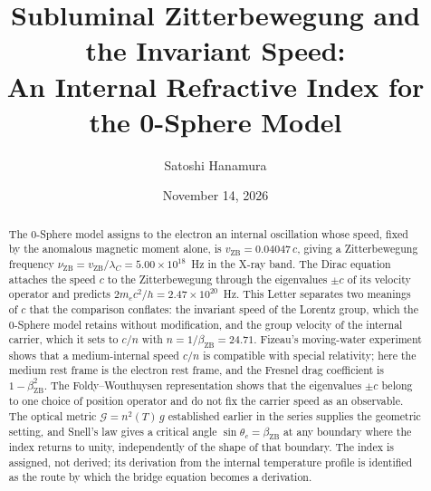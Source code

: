 \documentclass[%
 reprint, amsmath,amssymb, aps, prb, ]{revtex4-2}
\numberwithin{equation}{section}
\begin{document}
\title{Subluminal Zitterbewegung and the Invariant Speed:\\An Internal Refractive Index for the 0-Sphere Model}

\author{Satoshi Hanamura}

\date{November 14, 2026}

\begin{abstract}
The 0-Sphere model assigns to the electron an internal oscillation whose speed, fixed by the anomalous magnetic moment alone, is $v_{\text{ZB}} = 0.04047\,c$, giving a Zitterbewegung frequency $\nu_{\text{ZB}} = v_{\text{ZB}}/\lambda_C = 5.00\times10^{18}$~Hz in the X-ray band.
The Dirac equation attaches the speed $c$ to the Zitterbewegung through the eigenvalues $\pm c$ of its velocity operator and predicts $2m_ec^2/h = 2.47\times10^{20}$~Hz.
This Letter separates two meanings of $c$ that the comparison conflates: the invariant speed of the Lorentz group, which the 0-Sphere model retains without modification, and the group velocity of the internal carrier, which it sets to $c/n$ with $n = 1/\beta_{\text{ZB}} = 24.71$.
Fizeau's moving-water experiment shows that a medium-internal speed $c/n$ is compatible with special relativity; here the medium rest frame is the electron rest frame, and the Fresnel drag coefficient is $1-\beta_{\text{ZB}}^2$.
The Foldy--Wouthuysen representation shows that the eigenvalues $\pm c$ belong to one choice of position operator and do not fix the carrier speed as an observable.
The optical metric $\mathcal{G} = n^2(T)\,g$ established earlier in the series supplies the geometric setting, and Snell's law gives a critical angle $\sin\theta_c = \beta_{\text{ZB}}$ at any boundary where the index returns to unity, independently of the shape of that boundary.
The index is assigned, not derived; its derivation from the internal temperature profile is identified as the route by which the bridge equation becomes a derivation.
\end{abstract}

\maketitle

\end{document}
